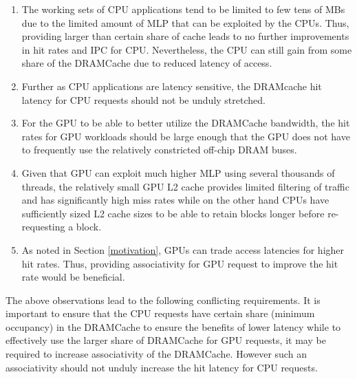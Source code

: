 \begin{enumerate}[label=(\roman*)]
	\item The working sets of CPU applications tend to be limited to few tens of MBs due to the limited amount of MLP that can be exploited by the CPUs. Thus, providing larger than certain share of cache leads to no further improvements in hit rates and IPC for CPU. Nevertheless, the CPU can still gain from some share of the DRAMCache due to reduced latency of access.
	\item Further as CPU applications are latency sensitive, the DRAMcache hit latency for CPU requests should not be unduly stretched.
	\item For the GPU to be able to better utilize the DRAMCache bandwidth, the hit rates for GPU workloads should be large enough that the GPU does not have to frequently use the relatively constricted off-chip DRAM buses.	
	\item Given that GPU can exploit much higher MLP using several thousands of threads, the relatively small GPU L2 cache provides limited filtering of traffic and has significantly high miss rates while on the other hand CPUs have sufficiently sized L2 cache sizes to be able to retain blocks longer before re-requesting a block.	
	\item As noted in Section \ref{motivation}, GPUs can trade access latencies for higher hit rates. Thus, providing associativity for GPU request to improve the hit rate would be beneficial.
\end{enumerate}

\par The above observations lead to the following conflicting requirements. It is important to ensure that the CPU requests have certain share (minimum occupancy) in the DRAMCache to ensure the benefits of lower latency while to effectively use the larger share of DRAMCache for GPU requests, it may be required to increase  associativity of the DRAMCache. However such an associativity should not unduly increase the hit latency for CPU requests. 

